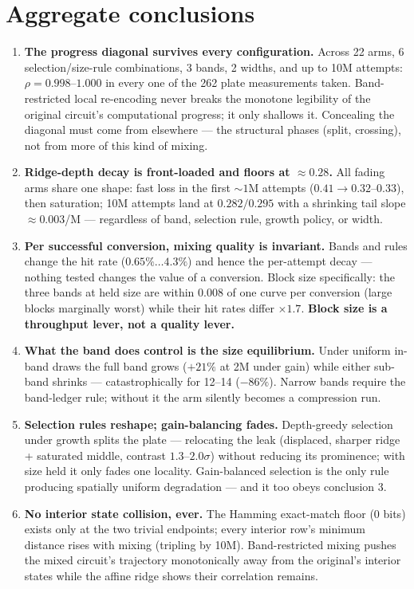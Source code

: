 \documentclass[11pt]{article}
\begin{document}
\section{Aggregate conclusions}
\begin{enumerate}
\item \textbf{The progress diagonal survives every configuration.} Across 22 arms, 6
selection/size-rule combinations, 3 bands, 2 widths, and up to 10M attempts: $\rho=0.998$--$1.000$ in
every one of the 262 plate measurements taken. Band-restricted local re-encoding never breaks the monotone legibility of the
original circuit's computational progress; it only shallows it. Concealing the diagonal must come from
elsewhere --- the structural phases (split, crossing), not from more of this kind of mixing.
\item \textbf{Ridge-depth decay is front-loaded and floors at ${\approx}0.28$.} All fading arms share
one shape: fast loss in the first ${\sim}1$M attempts ($0.41\to0.32$--$0.33$), then saturation; 10M
attempts land at $0.282/0.295$ with a shrinking tail slope ${\approx}0.003$/M --- regardless of band,
selection rule, growth policy, or width.
\item \textbf{Per successful conversion, mixing quality is invariant.} Bands and rules change the hit
rate ($0.65\%\ldots4.3\%$) and hence the per-attempt decay --- nothing tested changes the value of a
conversion. Block size specifically: the three bands at held size are within $0.008$ of one curve per
conversion (large blocks marginally worst) while their hit rates differ $\times1.7$. \textbf{Block
size is a throughput lever, not a quality lever.}
\item \textbf{What the band does control is the size equilibrium.} Under uniform in-band draws the
full band grows ($+21\%$ at 2M under gain) while either sub-band shrinks --- catastrophically for
12--14 ($-86\%$). Narrow bands require the band-ledger rule; without it the arm silently becomes a
compression run.
\item \textbf{Selection rules reshape; gain-balancing fades.} Depth-greedy selection under growth
splits the plate --- relocating the leak (displaced, sharper ridge + saturated middle, contrast
$1.3$--$2.0\sigma$) without reducing its prominence; with size held it only fades one locality.
Gain-balanced selection is the only rule producing spatially uniform degradation --- and it too obeys
conclusion 3.
\item \textbf{No interior state collision, ever.} The Hamming exact-match floor (0 bits) exists only
at the two trivial endpoints; every interior row's minimum distance rises with mixing (tripling by
10M). Band-restricted mixing pushes the mixed circuit's trajectory monotonically away from the
original's interior states while the affine ridge shows their correlation remains.
\end{enumerate}
\end{document}
